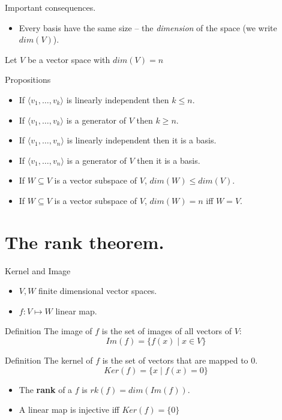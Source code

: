 \documentclass{beamer}
\begin{document}
\begin{frame}{Important consequences.}
  \begin{itemize}
  \item Every basis have the same size -- the \emph{dimension} of the space (we write $dim(V)$).
  \end{itemize}
  Let $V$ be a vector space with $dim(V) = n$
  \begin{block}{Propositions}
    \begin{itemize}
    \item If $\langle v_1, \dots, v_k \rangle$ is linearly independent then $k \le n$.
    \item If $\langle v_1, \dots, v_k \rangle$ is a generator of $V$ then $k \ge n$.
    \item If $\langle v_1, \dots, v_n \rangle$ is linearly independent then it is a basis.
    \item If $\langle v_1, \dots, v_n \rangle$ is a generator of $V$ then it is a basis.
    \item If $W \subseteq V$ is a vector subspace of $V$, $dim(W) \le dim(V)$.
    \item If $W \subseteq V$ is a vector subspace of $V$, $dim(W) = n$ iff $W = V$.
    \end{itemize}
  \end{block}
\end{frame}


\section{The rank theorem.}

\begin{frame}{Kernel and Image}
  \begin{itemize}
  \item $V, W$ finite dimensional vector spaces.
  \item $f: V \mapsto W$ linear map.
  \end{itemize}

  \begin{block}{Definition}
    The image of $f$ is the set of images of all vectors of $V$:
    \[Im(f) = \{ f(x) \mid x \in V \} \]
  \end{block}

  \begin{block}{Definition}
    The kernel of $f$ is the set of vectors that are mapped to $0$.
    \[Ker(f) = \{ x \mid f(x) = 0\}\]
  \end{block}

  \begin{itemize}
  \item The {\textbf{rank}} of a $f$ is $rk(f)=dim(Im(f))$.
  \item A linear map is injective iff $Ker(f) = \{0\}$
  \end{itemize}  
\end{frame}
\end{document}
